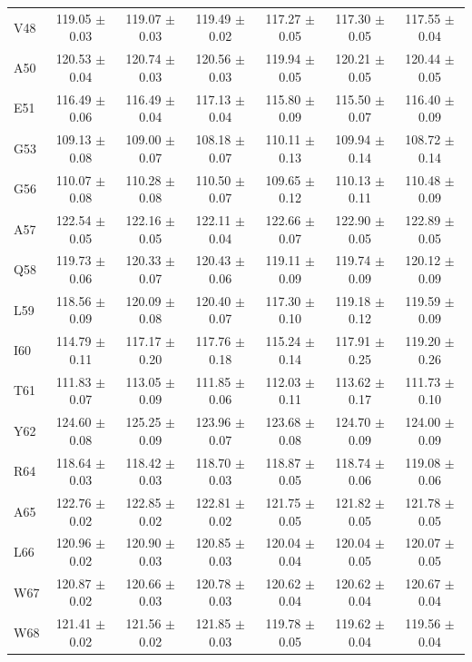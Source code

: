 \documentclass[%
 aip,
 amsmath,amssymb,
 preprint,%
]{revtex4-1}
\begin{document}
\begin{center}
\begin{longtable}{l|c|c|c|c|c|c}
V48 & 119.05 $\pm$ 0.03 & 119.07 $\pm$ 0.03 & 119.49 $\pm$ 0.02 & 117.27 $\pm$ 0.05 & 117.30 $\pm$ 0.05 & 117.55 $\pm$ 0.04 \\
A50 & 120.53 $\pm$ 0.04 & 120.74 $\pm$ 0.03 & 120.56 $\pm$ 0.03 & 119.94 $\pm$ 0.05 & 120.21 $\pm$ 0.05 & 120.44 $\pm$ 0.05 \\
E51 & 116.49 $\pm$ 0.06 & 116.49 $\pm$ 0.04 & 117.13 $\pm$ 0.04 & 115.80 $\pm$ 0.09 & 115.50 $\pm$ 0.07 & 116.40 $\pm$ 0.09 \\
G53 & 109.13 $\pm$ 0.08 & 109.00 $\pm$ 0.07 & 108.18 $\pm$ 0.07 & 110.11 $\pm$ 0.13 & 109.94 $\pm$ 0.14 & 108.72 $\pm$ 0.14 \\
G56 & 110.07 $\pm$ 0.08 & 110.28 $\pm$ 0.08 & 110.50 $\pm$ 0.07 & 109.65 $\pm$ 0.12 & 110.13 $\pm$ 0.11 & 110.48 $\pm$ 0.09 \\
A57 & 122.54 $\pm$ 0.05 & 122.16 $\pm$ 0.05 & 122.11 $\pm$ 0.04 & 122.66 $\pm$ 0.07 & 122.90 $\pm$ 0.05 & 122.89 $\pm$ 0.05 \\
Q58 & 119.73 $\pm$ 0.06 & 120.33 $\pm$ 0.07 & 120.43 $\pm$ 0.06 & 119.11 $\pm$ 0.09 & 119.74 $\pm$ 0.09 & 120.12 $\pm$ 0.09 \\
L59 & 118.56 $\pm$ 0.09 & 120.09 $\pm$ 0.08 & 120.40 $\pm$ 0.07 & 117.30 $\pm$ 0.10 & 119.18 $\pm$ 0.12 & 119.59 $\pm$ 0.09 \\
I60 & 114.79 $\pm$ 0.11 & 117.17 $\pm$ 0.20 & 117.76 $\pm$ 0.18 & 115.24 $\pm$ 0.14 & 117.91 $\pm$ 0.25 & 119.20 $\pm$ 0.26 \\
T61 & 111.83 $\pm$ 0.07 & 113.05 $\pm$ 0.09 & 111.85 $\pm$ 0.06 & 112.03 $\pm$ 0.11 & 113.62 $\pm$ 0.17 & 111.73 $\pm$ 0.10 \\
Y62 & 124.60 $\pm$ 0.08 & 125.25 $\pm$ 0.09 & 123.96 $\pm$ 0.07 & 123.68 $\pm$ 0.08 & 124.70 $\pm$ 0.09 & 124.00 $\pm$ 0.09 \\
R64 & 118.64 $\pm$ 0.03 & 118.42 $\pm$ 0.03 & 118.70 $\pm$ 0.03 & 118.87 $\pm$ 0.05 & 118.74 $\pm$ 0.06 & 119.08 $\pm$ 0.06 \\
A65 & 122.76 $\pm$ 0.02 & 122.85 $\pm$ 0.02 & 122.81 $\pm$ 0.02 & 121.75 $\pm$ 0.05 & 121.82 $\pm$ 0.05 & 121.78 $\pm$ 0.05 \\
L66 & 120.96 $\pm$ 0.02 & 120.90 $\pm$ 0.03 & 120.85 $\pm$ 0.03 & 120.04 $\pm$ 0.04 & 120.04 $\pm$ 0.05 & 120.07 $\pm$ 0.05 \\
W67 & 120.87 $\pm$ 0.02 & 120.66 $\pm$ 0.03 & 120.78 $\pm$ 0.03 & 120.62 $\pm$ 0.04 & 120.62 $\pm$ 0.04 & 120.67 $\pm$ 0.04 \\
W68 & 121.41 $\pm$ 0.02 & 121.56 $\pm$ 0.02 & 121.85 $\pm$ 0.03 & 119.78 $\pm$ 0.05 & 119.62 $\pm$ 0.04 & 119.56 $\pm$ 0.04 \\

\end{longtable}
\end{center}
\end{document}
